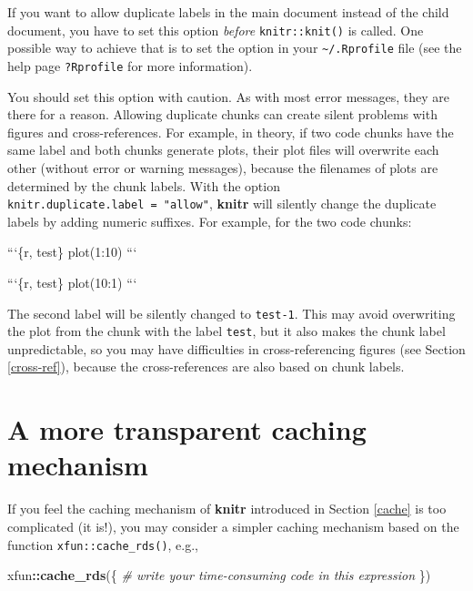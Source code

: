 \documentclass[
  11pt,
]{krantz}
\newenvironment{Shaded}{\begin{snugshade}}{\end{snugshade}}
\newcommand{\BaseNTok}[1]{\textcolor[rgb]{0.06,0.06,0.06}{#1}}
\newcommand{\CommentTok}[1]{\textcolor[rgb]{0.37,0.37,0.37}{\textit{#1}}}
\newcommand{\KeywordTok}[1]{\textcolor[rgb]{0.27,0.27,0.27}{\textbf{#1}}}
\newcommand{\NormalTok}[1]{#1}
\newcommand{\OperatorTok}[1]{\textcolor[rgb]{0.43,0.43,0.43}{\textbf{#1}}}
\begin{document}
If you want to allow duplicate labels in the main document instead of the child document, you have to set this option \emph{before} \texttt{knitr::knit()} is called. One possible way to achieve that is to set the option in your \texttt{\textasciitilde{}/.Rprofile} file (see the help page \texttt{?Rprofile} for more information).

You should set this option with caution. As with most error messages, they are there for a reason. Allowing duplicate chunks can create silent problems with figures and cross-references. For example, in theory, if two code chunks have the same label and both chunks generate plots, their plot files will overwrite each other (without error or warning messages), because the filenames of plots are determined by the chunk labels. With the option \texttt{knitr.duplicate.label\ =\ "allow"}, \textbf{knitr} will silently change the duplicate labels by adding numeric suffixes. For example, for the two code chunks:

\begin{Shaded}
\begin{Highlighting}[]
\BaseNTok{```\{r, test\}}
\BaseNTok{plot(1:10)}
\BaseNTok{```}

\BaseNTok{```\{r, test\}}
\BaseNTok{plot(10:1)}
\BaseNTok{```}
\end{Highlighting}
\end{Shaded}

The second label will be silently changed to \texttt{test-1}. This may avoid overwriting the plot from the chunk with the label \texttt{test}, but it also makes the chunk label unpredictable, so you may have difficulties in cross-referencing figures (see Section \ref{cross-ref}), because the cross-references are also based on chunk labels.

\hypertarget{cache-rds}{%
\section{A more transparent caching mechanism}\label{cache-rds}}

If you feel the caching mechanism of \textbf{knitr} introduced in Section \ref{cache} is too complicated (it is!), you may consider a simpler caching mechanism based on the function \texttt{xfun::cache\_rds()}, e.g.,

\begin{Shaded}
\begin{Highlighting}[]
\NormalTok{xfun}\OperatorTok{::}\KeywordTok{cache_rds}\NormalTok{(\{}
  \CommentTok{# write your time-consuming code in this expression}
\NormalTok{\})}
\end{Highlighting}
\end{Shaded}
\end{document}
